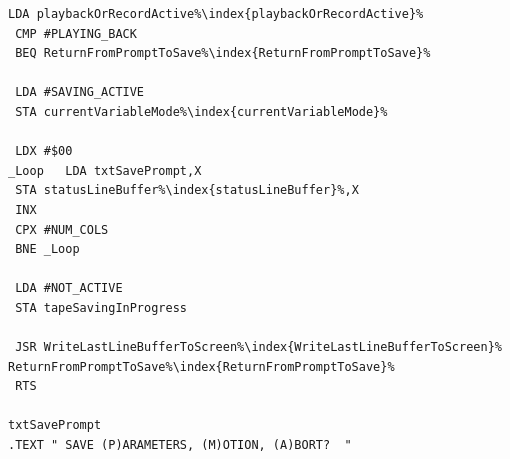 \begin{minipage}[b]{0.33\linewidth}
\begin{lrbox}{\mybox}
\begin{lstlisting}[basicstyle=\ttfamily\tiny,escapechar=\%]
 LDA playbackOrRecordActive%\index{playbackOrRecordActive}%
 CMP #PLAYING_BACK
 BEQ ReturnFromPromptToSave%\index{ReturnFromPromptToSave}%

 LDA #SAVING_ACTIVE
 STA currentVariableMode%\index{currentVariableMode}%

 LDX #$00
_Loop   LDA txtSavePrompt,X
 STA statusLineBuffer%\index{statusLineBuffer}%,X
 INX
 CPX #NUM_COLS
 BNE _Loop

 LDA #NOT_ACTIVE
 STA tapeSavingInProgress

 JSR WriteLastLineBufferToScreen%\index{WriteLastLineBufferToScreen}%
ReturnFromPromptToSave%\index{ReturnFromPromptToSave}%
 RTS

txtSavePrompt
.TEXT " SAVE (P)ARAMETERS, (M)OTION, (A)BORT?  "

\end{lstlisting}
\end{lrbox}%
\scalebox{0.8}{\usebox{\mybox}}
\end{minipage}
